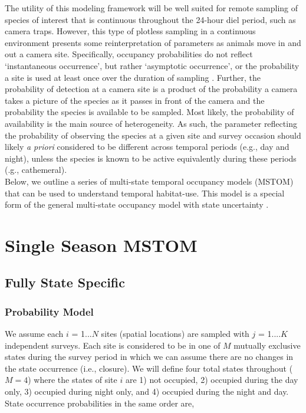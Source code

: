 \documentclass[12pt]{article}
\begin{document}
The utility of this modeling framework will be well suited for remote sampling of species of interest that is continuous throughout the 24-hour diel period, such as camera traps. However, this type of plotless sampling in a continuous environment presents some reinterpretation of parameters as animals move in and out a camera site. Specifically, occupancy probabilities do not reflect `instantaneous occurrence', but rather `asymptotic occurrence', or the probability a site is used at least once over the duration of sampling \citep{efford2012}. Further, the probability of detection at a camera site is a product of the probability a camera takes a picture of the species as it passes in front of the camera and the probability the species is available to be sampled. Most likely, the probability of availability is the main source of heterogeneity. As such, the parameter reflecting the probability of observing the species at a given site and survey occasion should likely \emph{a priori} considered to be different across temporal periods (e.g., day and night), unless the species is known to be active equivalently during these periods (\emph{}.g., cathemeral).\\

Below, we outline a series of multi-state temporal occupancy models (MSTOM) that can be used to understand temporal habitat-use. This model is a special form of the general multi-state occupancy model with state uncertainty \citep{MacKenzie2009}. 



\section{Single Season MSTOM}
\subsection{Fully State Specific}
\subsubsection{Probability Model}
We assume each $i$ = 1...$N$ sites (spatial locations) are sampled with $j$ = 1....$K$ independent surveys. Each site is considered to be in one of $M$ mutually exclusive states during the survey period in which we can assume there are no changes in the state occurrence (i.e., closure). We will define four total states throughout ($M = 4$) where the states of site $i$ are 1) not occupied, 2) occupied during the day only, 3) occupied during night only, and 4) occupied during the night and day. State occurrence probabilities in the same order are, 
\end{document}
